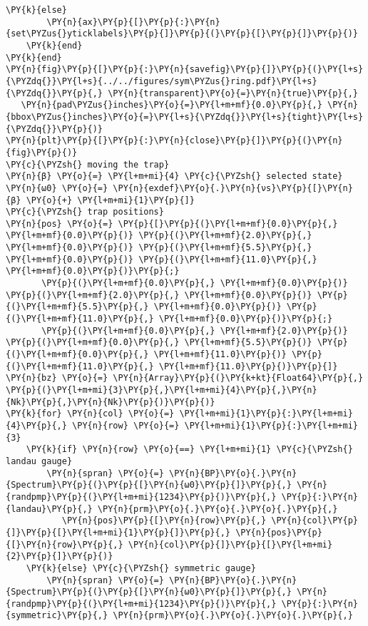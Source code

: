 \begin{Verbatim}[commandchars=\\\{\}]
    \PY{k}{else}
        \PY{n}{ax}\PY{p}{[}\PY{p}{:}\PY{n}{set\PYZus{}yticklabels}\PY{p}{]}\PY{p}{(}\PY{p}{[}\PY{p}{]}\PY{p}{)}
    \PY{k}{end}
\PY{k}{end}
\PY{n}{fig}\PY{p}{[}\PY{p}{:}\PY{n}{savefig}\PY{p}{]}\PY{p}{(}\PY{l+s}{\PYZdq{}}\PY{l+s}{../../figures/sym\PYZus{}ring.pdf}\PY{l+s}{\PYZdq{}}\PY{p}{,} \PY{n}{transparent}\PY{o}{=}\PY{n}{true}\PY{p}{,}
   \PY{n}{pad\PYZus{}inches}\PY{o}{=}\PY{l+m+mf}{0.0}\PY{p}{,} \PY{n}{bbox\PYZus{}inches}\PY{o}{=}\PY{l+s}{\PYZdq{}}\PY{l+s}{tight}\PY{l+s}{\PYZdq{}}\PY{p}{)}
\PY{n}{plt}\PY{p}{[}\PY{p}{:}\PY{n}{close}\PY{p}{]}\PY{p}{(}\PY{n}{fig}\PY{p}{)}
\PY{c}{\PYZsh{} moving the trap}
\PY{n}{β} \PY{o}{=} \PY{l+m+mi}{4} \PY{c}{\PYZsh{} selected state}
\PY{n}{ω0} \PY{o}{=} \PY{n}{exdef}\PY{o}{.}\PY{n}{νs}\PY{p}{[}\PY{n}{β} \PY{o}{+} \PY{l+m+mi}{1}\PY{p}{]}
\PY{c}{\PYZsh{} trap positions}
\PY{n}{pos} \PY{o}{=} \PY{p}{[}\PY{p}{(}\PY{l+m+mf}{0.0}\PY{p}{,} \PY{l+m+mf}{0.0}\PY{p}{)} \PY{p}{(}\PY{l+m+mf}{2.0}\PY{p}{,} \PY{l+m+mf}{0.0}\PY{p}{)} \PY{p}{(}\PY{l+m+mf}{5.5}\PY{p}{,} \PY{l+m+mf}{0.0}\PY{p}{)} \PY{p}{(}\PY{l+m+mf}{11.0}\PY{p}{,} \PY{l+m+mf}{0.0}\PY{p}{)}\PY{p}{;}
       \PY{p}{(}\PY{l+m+mf}{0.0}\PY{p}{,} \PY{l+m+mf}{0.0}\PY{p}{)} \PY{p}{(}\PY{l+m+mf}{2.0}\PY{p}{,} \PY{l+m+mf}{0.0}\PY{p}{)} \PY{p}{(}\PY{l+m+mf}{5.5}\PY{p}{,} \PY{l+m+mf}{0.0}\PY{p}{)} \PY{p}{(}\PY{l+m+mf}{11.0}\PY{p}{,} \PY{l+m+mf}{0.0}\PY{p}{)}\PY{p}{;}
       \PY{p}{(}\PY{l+m+mf}{0.0}\PY{p}{,} \PY{l+m+mf}{2.0}\PY{p}{)} \PY{p}{(}\PY{l+m+mf}{0.0}\PY{p}{,} \PY{l+m+mf}{5.5}\PY{p}{)} \PY{p}{(}\PY{l+m+mf}{0.0}\PY{p}{,} \PY{l+m+mf}{11.0}\PY{p}{)} \PY{p}{(}\PY{l+m+mf}{11.0}\PY{p}{,} \PY{l+m+mf}{11.0}\PY{p}{)}\PY{p}{]}
\PY{n}{bz} \PY{o}{=} \PY{n}{Array}\PY{p}{(}\PY{k+kt}{Float64}\PY{p}{,} \PY{p}{(}\PY{l+m+mi}{3}\PY{p}{,}\PY{l+m+mi}{4}\PY{p}{,}\PY{n}{Nk}\PY{p}{,}\PY{n}{Nk}\PY{p}{)}\PY{p}{)}
\PY{k}{for} \PY{n}{col} \PY{o}{=} \PY{l+m+mi}{1}\PY{p}{:}\PY{l+m+mi}{4}\PY{p}{,} \PY{n}{row} \PY{o}{=} \PY{l+m+mi}{1}\PY{p}{:}\PY{l+m+mi}{3}
    \PY{k}{if} \PY{n}{row} \PY{o}{==} \PY{l+m+mi}{1} \PY{c}{\PYZsh{} landau gauge}
        \PY{n}{spran} \PY{o}{=} \PY{n}{BP}\PY{o}{.}\PY{n}{Spectrum}\PY{p}{(}\PY{p}{[}\PY{n}{ω0}\PY{p}{]}\PY{p}{,} \PY{n}{randpmp}\PY{p}{(}\PY{l+m+mi}{1234}\PY{p}{)}\PY{p}{,} \PY{p}{:}\PY{n}{landau}\PY{p}{,} \PY{n}{prm}\PY{o}{.}\PY{o}{.}\PY{o}{.}\PY{p}{,}
           \PY{n}{pos}\PY{p}{[}\PY{n}{row}\PY{p}{,} \PY{n}{col}\PY{p}{]}\PY{p}{[}\PY{l+m+mi}{1}\PY{p}{]}\PY{p}{,} \PY{n}{pos}\PY{p}{[}\PY{n}{row}\PY{p}{,} \PY{n}{col}\PY{p}{]}\PY{p}{[}\PY{l+m+mi}{2}\PY{p}{]}\PY{p}{)}
    \PY{k}{else} \PY{c}{\PYZsh{} symmetric gauge}
        \PY{n}{spran} \PY{o}{=} \PY{n}{BP}\PY{o}{.}\PY{n}{Spectrum}\PY{p}{(}\PY{p}{[}\PY{n}{ω0}\PY{p}{]}\PY{p}{,} \PY{n}{randpmp}\PY{p}{(}\PY{l+m+mi}{1234}\PY{p}{)}\PY{p}{,} \PY{p}{:}\PY{n}{symmetric}\PY{p}{,} \PY{n}{prm}\PY{o}{.}\PY{o}{.}\PY{o}{.}\PY{p}{,}

\end{Verbatim}
